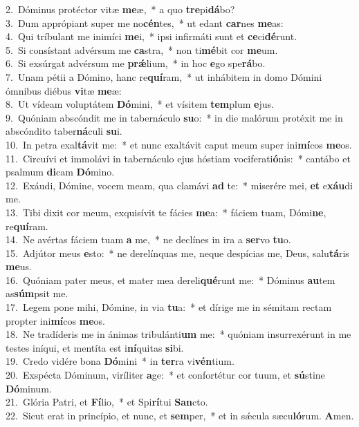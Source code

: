 {2.~}Dóminus protéctor vitæ \textbf{me}æ,~* a quo \textbf{tre}pi\textbf{dá}bo?\\
{3.~}Dum apprópiant super me no\textbf{cén}tes,~* ut edant \textbf{car}nes \textbf{me}as:\\
{4.~}Qui tríbulant me inimíci \textbf{me}i,~* ipsi infirmáti sunt et \textbf{ce}ci\textbf{dé}runt.\\
{5.~}Si consístant advérsum me \textbf{ca}stra,~* non ti\textbf{mé}bit cor \textbf{me}um.\\
{6.~}Si exsúrgat advérsum me \textbf{prǽ}lium,~* in hoc \textbf{e}go spe\textbf{rá}bo.\\
{7.~}Unam pétii a Dómino, hanc re\textbf{quí}ram,~* ut inhábitem in domo Dómini ómnibus diébus \textbf{vi}tæ \textbf{me}æ:\\
{8.~}Ut vídeam voluptátem \textbf{Dó}mini,~* et vísitem \textbf{tem}plum \textbf{e}jus.\\
{9.~}Quóniam abscóndit me in tabernáculo \textbf{su}o:~* in die malórum protéxit me in abscóndito taber\textbf{ná}culi \textbf{su}i.\\
{10.~}In petra exal\textbf{tá}vit me:~* et nunc exaltávit caput meum super ini\textbf{mí}cos \textbf{me}os.\\
{11.~}Circuívi et immolávi in tabernáculo ejus hóstiam vociferati\textbf{ó}nis:~* cantábo et psalmum \textbf{di}cam \textbf{Dó}mino.\\
{12.~}Exáudi, Dómine, vocem meam, qua clamávi \textbf{ad} te:~* miserére mei, \textbf{et} e\textbf{xáu}di me.\\
{13.~}Tibi dixit cor meum, exquisívit te fácies \textbf{me}a:~* fáciem tuam, Dómi\textbf{ne}, re\textbf{quí}ram.\\
{14.~}Ne avértas fáciem tuam \textbf{a} me,~* ne declínes in ira a \textbf{ser}vo \textbf{tu}o.\\
{15.~}Adjútor meus \textbf{e}sto:~* ne derelínquas me, neque despícias me, Deus, salu\textbf{tá}ris \textbf{me}us.\\
{16.~}Quóniam pater meus, et mater mea dereli\textbf{qué}runt me:~* Dóminus \textbf{au}tem as\textbf{súm}psit me.\\
{17.~}Legem pone mihi, Dómine, in via \textbf{tu}a:~* et dírige me in sémitam rectam propter ini\textbf{mí}cos \textbf{me}os.\\
{18.~}Ne tradíderis me in ánimas tribulánti\textbf{um} me:~* quóniam insurrexérunt in me testes iníqui, et mentíta est i\textbf{ní}quitas \textbf{si}bi.\\
{19.~}Credo vidére bona \textbf{Dó}mini~* in \textbf{ter}ra vi\textbf{vén}tium.\\
{20.~}Exspécta Dóminum, viríliter \textbf{a}ge:~* et confortétur cor tuum, et \textbf{sú}stine \textbf{Dó}minum.\\
{21.~}Glória Patri, et \textbf{Fí}lio,~* et Spi\textbf{rí}tui \textbf{San}cto.\\
{22.~}Sicut erat in princípio, et nunc, et \textbf{sem}per,~* et in sǽcula sæcu\textbf{ló}rum. \textbf{A}men.\\
